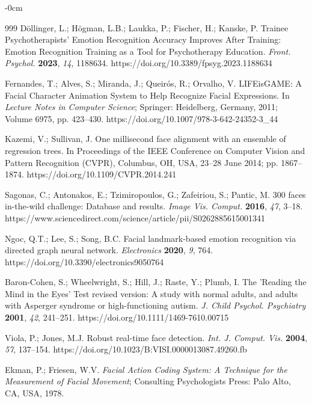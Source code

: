 \documentclass[journal,article,submit,pdftex,moreauthors]{Definitions/mdpi}
\begin{document}
\begin{adjustwidth}{-\extralength}{0cm}
\begin{thebibliography}{999}
		Döllinger, L.; Högman, L.B.; Laukka, P.; Fischer, H.; Kanske, P. Trainee Psychotherapists' Emotion Recognition Accuracy Improves After Training: Emotion Recognition Training as a Tool for Psychotherapy Education. {\em Front. Psychol.} {\bf 2023}, {\em 14}, 1188634. https://doi.org/10.3389/fpsyg.2023.1188634
		
		Fernandes, T.; Alves, S.; Miranda, J.; Queirós, R.; Orvalho, V. LIFEisGAME: A Facial Character Animation System to Help Recognize Facial Expressions. In {\em Lecture Notes in Computer Science}; Springer: Heidelberg, Germany, 2011; Volume 6975, pp. 423--430. https://doi.org/10.1007/978-3-642-24352-3\_44
		
		Kazemi, V.; Sullivan, J. One millisecond face alignment with an ensemble of regression trees. In Proceedings of the IEEE Conference on Computer Vision and Pattern Recognition (CVPR), Columbus, OH, USA, 23--28 June 2014; pp. 1867--1874. https://doi.org/10.1109/CVPR.2014.241
		
		Sagonas, C.; Antonakos, E.; Tzimiropoulos, G.; Zafeiriou, S.; Pantic, M. 300 faces in-the-wild challenge: Database and results. {\em Image Vis. Comput.} {\bf 2016}, {\em 47}, 3--18. https://www.sciencedirect.com/science/article/pii/S0262885615001341
		
		Ngoc, Q.T.; Lee, S.; Song, B.C. Facial landmark-based emotion recognition via directed graph neural network. {\em Electronics} {\bf 2020}, {\em 9}, 764. https://doi.org/10.3390/electronics9050764
		
		Baron-Cohen, S.; Wheelwright, S.; Hill, J.; Raste, Y.; Plumb, I. The 'Reading the Mind in the Eyes' Test revised version: A study with normal adults, and adults with Asperger syndrome or high-functioning autism. {\em J. Child Psychol. Psychiatry} {\bf 2001}, {\em 42}, 241--251. https://doi.org/10.1111/1469-7610.00715
		
		Viola, P.; Jones, M.J. Robust real-time face detection. {\em Int. J. Comput. Vis.} {\bf 2004}, {\em 57}, 137--154. https://doi.org/10.1023/B:VISI.0000013087.49260.fb
		
		Ekman, P.; Friesen, W.V. {\em Facial Action Coding System: A Technique for the Measurement of Facial Movement}; Consulting Psychologists Press: Palo Alto, CA, USA, 1978.
		

\end{thebibliography}
\end{adjustwidth}
\end{document}
